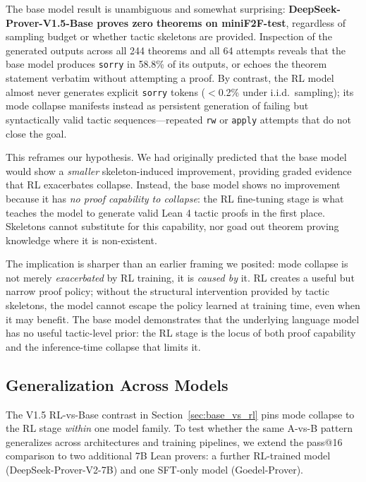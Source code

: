 \documentclass{article}
\begin{document}
The base model result is unambiguous and somewhat surprising: \textbf{DeepSeek-Prover-V1.5-Base proves zero theorems on miniF2F-test}, regardless of sampling budget or whether tactic skeletons are provided. Inspection of the generated outputs across all 244 theorems and all 64 attempts reveals that the base model produces \texttt{sorry} in 58.8\% of its outputs, or echoes the theorem statement verbatim without attempting a proof. By contrast, the RL model almost never generates explicit \texttt{sorry} tokens ($<$0.2\% under i.i.d.\ sampling); its mode collapse manifests instead as persistent generation of failing but syntactically valid tactic sequences---repeated \texttt{rw} or \texttt{apply} attempts that do not close the goal.

This reframes our hypothesis. We had originally predicted that the base model would show a \emph{smaller} skeleton-induced improvement, providing graded evidence that RL exacerbates collapse. Instead, the base model shows no improvement because it has \emph{no proof capability to collapse}: the RL fine-tuning stage is what teaches the model to generate valid Lean 4 tactic proofs in the first place. Skeletons cannot substitute for this capability, nor goad out theorem proving knowledge where it is non-existent.

The implication is sharper than an earlier framing we posited: mode collapse is not merely \emph{exacerbated} by RL training, it is \emph{caused by} it. RL creates a useful but narrow proof policy; without the structural intervention provided by tactic skeletons, the model cannot escape the policy learned at training time, even when it may benefit. The base model demonstrates that the underlying language model has no useful tactic-level prior: the RL stage is the locus of both proof capability and the inference-time collapse that limits it.

\subsection{Generalization Across Models}
\label{sec:multi_model}

The V1.5 RL-vs-Base contrast in Section~\ref{sec:base_vs_rl} pins mode collapse to the RL stage \emph{within} one model family. To test whether the same A-vs-B pattern generalizes across architectures and training pipelines, we extend the pass@16 comparison to two additional 7B Lean provers: a further RL-trained model (DeepSeek-Prover-V2-7B) and one SFT-only model (Goedel-Prover).
\end{document}
